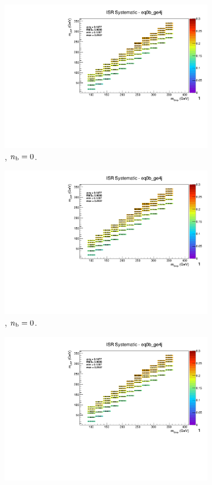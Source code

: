 \begin{figure}[ht!]
\begin{subfigure}[b]{0.32\textwidth}
    \includegraphics[width=\textwidth, page=12]{Figs/sms/t2cc/v37/systs_v2/T2cc_ISR_eq0b_ge4j.pdf}
    \caption{\njhigh, $n_{\text{b}} = 0$.}
  \end{subfigure}
  \begin{subfigure}[b]{0.32\textwidth}
    \includegraphics[width=\textwidth, page=8]{Figs/sms/t2cc/v37/systs_v2/T2cc_ISR_eq0b_ge4j.pdf}
    \caption{\njhigh, $n_{\text{b}} = 0$.}
  \end{subfigure}
  \begin{subfigure}[b]{0.32\textwidth}
    \includegraphics[width=\textwidth, page=1]{Figs/sms/t2cc/v37/systs_v2/T2cc_ISR_eq0b_ge4j.pdf}

\end{subfigure}
\end{figure}
